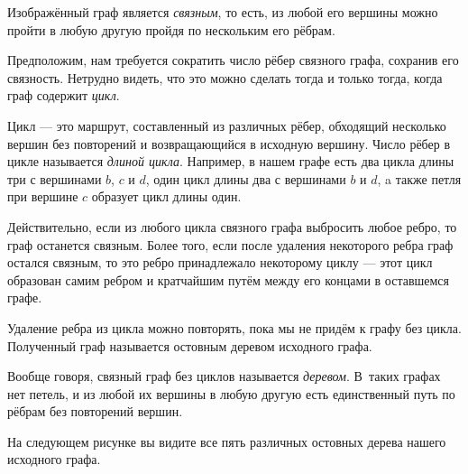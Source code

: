 \documentclass{article}
\begin{document}
Изображённый граф является \emph{связным}, то есть, из любой его вершины можно пройти в любую другую пройдя по нескольким его рёбрам.

Предположим, нам требуется сократить число рёбер связного графа, сохранив его связность.
Нетрудно видеть, что это можно сделать тогда и только тогда, когда граф содержит \emph{цикл}.

Цикл --- это маршрут, составленный из различных рёбер, обходящий несколько вершин без повторений 
и возвращающийся в исходную вершину. 
Число рёбер в цикле называется \emph{длиной цикла}.
Например, в нашем графе есть два цикла длины три с вершинами $b$, $c$ и $d$, 
один цикл длины два с вершинами $b$ и $d$,
a также петля при вершине $c$ образует цикл длины один.

Действительно, если из любого цикла связного графа выбросить любое ребро, то граф останется связным.
Более того, если после удаления некоторого ребра граф остался связным, то это ребро принадлежало некоторому циклу --- этот цикл образован самим ребром и кратчайшим путём между его концами в оставшемся графе.

Удаление ребра из цикла можно повторять, пока мы не придём к графу без цикла.
Полученный граф называется остовным деревом исходного графа.

Вообще говоря, связный граф без циклов называется \emph{деревом}.
В~таких графах нет петель, и из любой их вершины в любую другую есть единственный путь по рёбрам без повторений вершин.

На следующем рисунке вы видите все пять различных остовных дерева нашего исходного графа.
\end{document}
